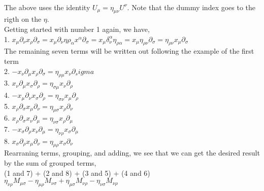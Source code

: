 \documentclass[prb,preprint]
{revtex4-1}
\begin{document}
\\
The above uses the identity $U_\mu = \eta_{\mu\nu}U^\nu$.  Note that the dummy index goes to the rigth on the $\eta$.
\\
Getting started with number 1 again, we have,
\\
1.  $x_\mu \partial_\nu x_\rho \partial_\sigma = x_\mu\partial_\nu\eta{\rho_\alpha}x^\alpha \partial_\sigma = x_\mu \delta_\nu^\alpha \eta_{\rho\alpha} = x_\mu \eta_{\rho\nu} \partial_\sigma = \eta_{\rho\nu} x_\mu \partial_\sigma$
\\
The remaining seven terms will be written out following the example of the first term
\\
2.  $-x_\nu \partial_\mu x_\rho \partial_\sigma = \eta_{\rho\mu} x_\nu \partial_sigma$
\\
3.  $x_\nu \partial_\mu x_\sigma \partial_\rho = \eta_{\sigma\mu} x_\nu \partial_\rho$
\\
4.  $-x_\mu \partial_\nu x_\sigma \partial_\rho = \eta_{\sigma\nu} x_\mu \partial_\rho$
\\
5.  $x_\rho \partial_\sigma x_\mu \partial_\nu = \eta_{\mu\sigma} x_\rho \partial_\nu$
\\
6.  $x_\rho \partial_\sigma x_\nu \partial_\mu = \eta_{\nu\sigma} x_\rho \partial_\mu$
\\
7.  $-x_\sigma \partial_\rho x_\nu \partial_\mu = \eta_{\nu\rho} x_\sigma \partial_\mu$
\\
8.  $x_\sigma \partial_\rho x_\mu \partial_\nu = \eta_{\mu\rho} x_\sigma \partial_\nu$
\\
Rearraning terms, grouping, and adding, we see that we can get the desired result by the sum of grouped terms, 
\\
(1 and 7) + (2 and 8) + (3 and 5) + (4 and 6)
\\
$\eta_{\nu\rho}M_{\mu\sigma} - \eta_{\mu\rho}M_{\nu\sigma} + \eta_{\mu\sigma}M_{\nu\rho} - \eta_{\nu\sigma}M_{\nu\rho}$




\end{document}
